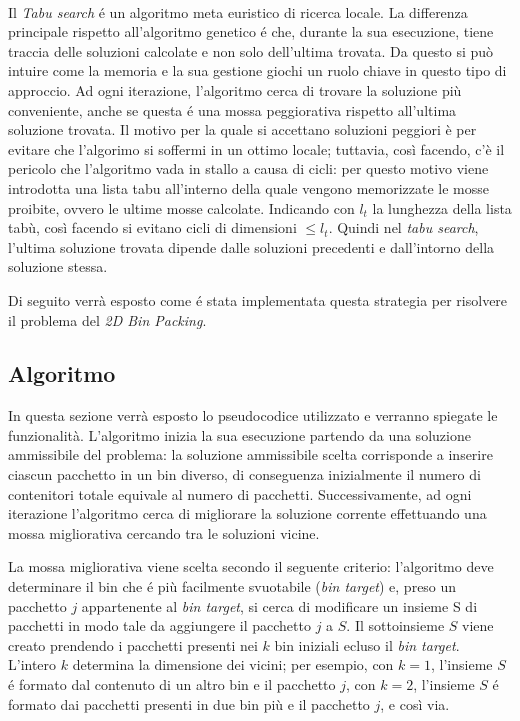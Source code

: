 \paragraph{}
Il \textit{Tabu search} é un algoritmo meta euristico di ricerca locale. La differenza principale rispetto all'algoritmo genetico é che, durante la sua esecuzione, tiene traccia delle soluzioni calcolate e non solo dell'ultima trovata. Da questo si può intuire come la memoria e la sua gestione giochi un ruolo chiave in questo tipo di approccio. Ad ogni iterazione, l'algoritmo cerca di trovare la soluzione più conveniente, anche se questa é una mossa peggiorativa rispetto all'ultima soluzione trovata. Il motivo per la quale si accettano soluzioni peggiori è per evitare che l'algorimo si soffermi in un ottimo locale; tuttavia, così facendo, c'è il pericolo che l'algoritmo vada in stallo a causa di cicli: per questo motivo viene introdotta una lista tabu all'interno della quale vengono memorizzate le mosse proibite, ovvero le ultime mosse calcolate. Indicando con $l_t$ la lunghezza della lista tabù, così facendo si evitano cicli di dimensioni $\le l_t$. Quindi nel \textit{tabu search}, l'ultima soluzione trovata dipende dalle soluzioni precedenti e dall'intorno della soluzione stessa.
   
Di seguito verrà esposto come é stata implementata questa strategia per risolvere il problema del \textit{2D Bin Packing}.

\subsection{Algoritmo}
In questa sezione verrà esposto lo pseudocodice utilizzato e verranno spiegate le funzionalità.
L'algoritmo inizia la sua esecuzione partendo da una soluzione ammissibile del problema: la soluzione ammissibile scelta corrisponde a inserire ciascun pacchetto in un bin diverso, di conseguenza inizialmente il numero di contenitori totale equivale al numero di pacchetti. Successivamente, ad ogni iterazione l'algoritmo cerca di migliorare la soluzione corrente effettuando una mossa migliorativa cercando tra le soluzioni vicine.

La mossa migliorativa viene scelta secondo il seguente criterio: l'algoritmo deve determinare il bin che é più facilmente svuotabile (\textit{bin target}) e, preso un pacchetto $j$ appartenente al \textit{bin target}, si cerca di modificare un insieme S di pacchetti in modo tale da aggiungere il pacchetto $j$ a $S$. Il sottoinsieme $S$ viene creato prendendo i pacchetti presenti nei $k$ bin iniziali ecluso il \textit{bin target}. L'intero $k$ determina la dimensione dei vicini; per esempio, con $k=1$, l'insieme $S$ é formato dal contenuto di un altro bin e il pacchetto $j$, con $k=2$, l'insieme $S$ é formato dai pacchetti presenti in due bin più e il pacchetto $j$, e così via.

